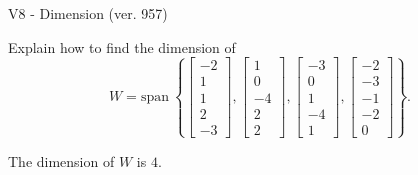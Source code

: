 \begin{exercise}
  \begin{exerciseTitle}V8 - Dimension (ver. 957)\end{exerciseTitle}
  \begin{exerciseStatement}
    Explain how to find the dimension of 
\[W=\mathrm{span}\ \left\{\left[\begin{array}{r}
-2 \\
1 \\
1 \\
2 \\
-3
\end{array}\right] , \left[\begin{array}{r}
1 \\
0 \\
-4 \\
2 \\
2
\end{array}\right] , \left[\begin{array}{r}
-3 \\
0 \\
1 \\
-4 \\
1
\end{array}\right] , \left[\begin{array}{r}
-2 \\
-3 \\
-1 \\
-2 \\
0
\end{array}\right]\right\}.\]



  \end{exerciseStatement}
  \begin{exerciseAnswer}
   The dimension of \(W\) is  \(4\).
  


  \end{exerciseAnswer}
\end{exercise}